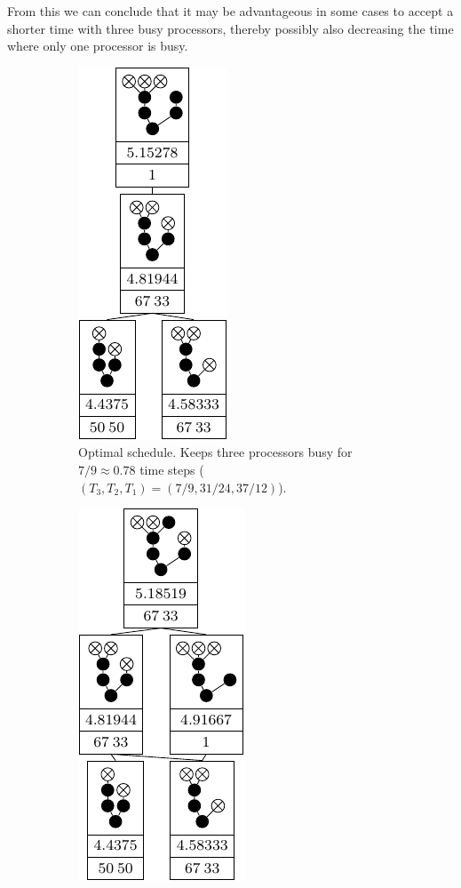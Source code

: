 From this we can conclude that it may be advantageous in some cases to accept a shorter time with three busy processors, thereby possibly also decreasing the time where only one processor is busy.

\begin{figure}[ht]
  \centering
  \begin{subfigure}{.45\linewidth}
    \centering
    \includegraphics{p3/keep_3_busy/three_busy_opt.pdf}
    \caption{Optimal schedule. Keeps three processors busy for $7/9\approx 0.78$ time steps ($(T_3, T_2, T_1)=(7/9, 31/24, 37/12)$).}
  \end{subfigure}
  \quad
  \begin{subfigure}{.45\linewidth}
    \centering
    \includegraphics{p3/keep_3_busy/three_busy_subopt.pdf}

\end{subfigure}
\end{figure}
